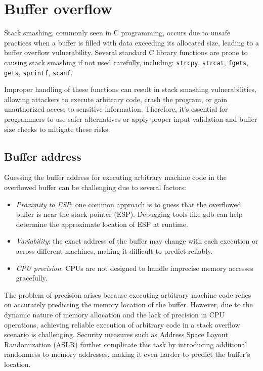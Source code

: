 \section{Buffer overflow}

Stack smashing, commonly seen in C programming, occurs due to unsafe practices when a buffer is filled with data exceeding its allocated size, leading to a buffer overflow vulnerability. 
Several standard C library functions are prone to causing stack smashing if not used carefully, including: \texttt{strcpy}, \texttt{strcat}, \texttt{fgets}, \texttt{gets}, \texttt{sprintf}, \texttt{scanf}.

Improper handling of these functions can result in stack smashing vulnerabilities, allowing attackers to execute arbitrary code, crash the program, or gain unauthorized access to sensitive information. 
Therefore, it's essential for programmers to use safer alternatives or apply proper input validation and buffer size checks to mitigate these risks.

\subsection{Buffer address}
Guessing the buffer address for executing arbitrary machine code in the overflowed buffer can be challenging due to several factors:
\begin{itemize}
    \item \textit{Proximity to ESP}: one common approach is to guess that the overflowed buffer is near the stack pointer (ESP).
        Debugging tools like gdb can help determine the approximate location of ESP at runtime.
    \item \textit{Variability}: the exact address of the buffer may change with each execution or across different machines, making it difficult to predict reliably.
    \item \textit{CPU precision}: CPUs are not designed to handle imprecise memory accesses gracefully.
\end{itemize}
The problem of precision arises because executing arbitrary machine code relies on accurately predicting the memory location of the buffer. 
However, due to the dynamic nature of memory allocation and the lack of precision in CPU operations, achieving reliable execution of arbitrary code in a stack overflow scenario is challenging. 
Security measures such as Address Space Layout Randomization (ASLR) further complicate this task by introducing additional randomness to memory addresses, making it even harder to predict the buffer's location.

